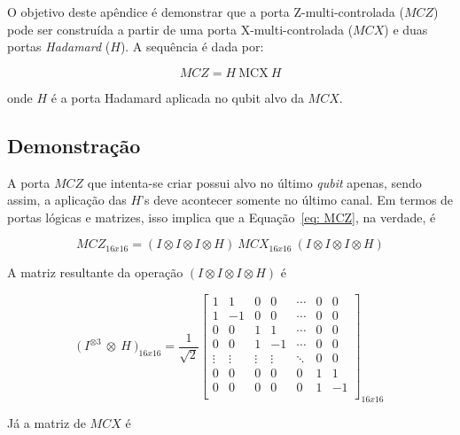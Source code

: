 \label{ap: apendiceC}

O objetivo deste apêndice é demonstrar que a porta Z-multi-controlada ($MCZ$) pode ser construída a partir de uma porta X-multi-controlada ($MCX$) e duas portas \textit{Hadamard} (\(H\)). A sequência é dada por:

\begin{equation}
    MCZ = H~\text{MCX}~H
    \label{eq: MCZ}
\end{equation}

onde \(H\) é a porta Hadamard aplicada no qubit alvo da $MCX$.

\subsection*{Demonstração}

A porta $MCZ$ que intenta-se criar possui alvo no último \textit{qubit} apenas, sendo assim, a aplicação das $H$'s deve acontecer somente no último canal. Em termos de portas lógicas e matrizes, isso implica que a Equação~\ref{eq: MCZ}, na verdade, é

\begin{equation}
    MCZ_{16x16} = (I \otimes I \otimes I \otimes H)~MCX_{16x16}~(I \otimes I \otimes I \otimes H)
    \label{eq: MCZ 2}
\end{equation}

A matriz resultante da operação $(I \otimes I \otimes I \otimes H)$ é

\begin{equation}
    \bigl(~I^{\otimes 3}~ \otimes ~H~\bigr)_{16x16} = \frac{1}{\sqrt{2}}
    \begin{bmatrix}
        1 & 1 & 0 & 0 & \cdots & 0 & 0 \\
        1 & -1 & 0 & 0 & \cdots & 0 & 0 \\
        0 & 0 & 1 & 1 & \cdots & 0 & 0 \\
        0 & 0 & 1 & -1 & \cdots & 0 & 0 \\
        \vdots & \vdots & \vdots & \vdots & \ddots & 0 & 0 \\
        0 & 0 & 0 & 0 & 0 & 1 & 1 \\
        0 & 0 & 0 & 0 & 0 & 1 & -1 \\
    \end{bmatrix}
    _{16x16}
\end{equation}

Já a matriz de $MCX$ é

